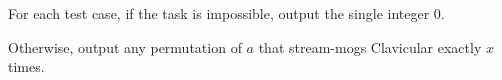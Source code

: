 For each test case, if the task is impossible, output the single integer $0$.

Otherwise, output any permutation of $a$ that stream-mogs Clavicular
exactly $x$ times.
